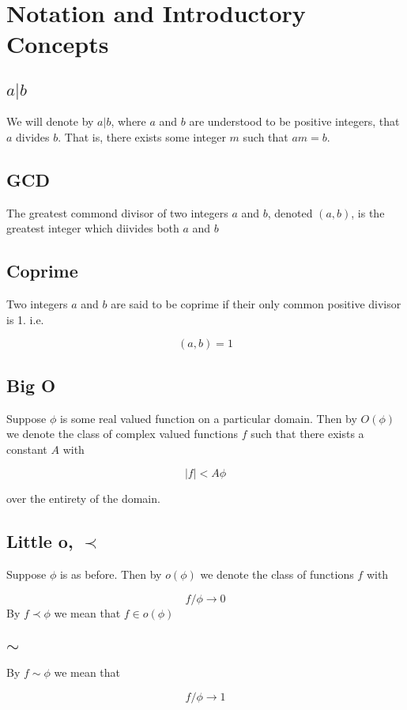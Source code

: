 \section{Notation and Introductory Concepts}

\subsection{$a|b$}

We will denote by $a|b$, where $a$ and $b$ are understood to be positive integers, that $a$ divides $b$. That is, 
there exists some integer $m$ such that $am = b$.

\subsection{GCD}
The greatest commond divisor of two integers $a$ and $b$, denoted $(a,b)$, is the greatest integer which diivides 
both $a$ and $b$

\subsection{Coprime}
Two integers $a$ and $b$ are said to be coprime if their only common positive divisor is 1. i.e.

\begin{equation*}
    (a, b) = 1
\end{equation*}

\subsection{Big O}

\noi
Suppose $\phi$ is some real valued function on a particular domain. Then by $O(\phi)$ we denote the class of complex valued 
functions $f$ such that there exists a constant $A$ with

\begin{equation*}
    |f| < A\phi
\end{equation*}

\noi
over the entirety of the domain.

\subsection{Little o, $\prec$}
Suppose $\phi$ is as before. Then by $o(\phi)$ we denote the class of functions $f$ with

\begin{equation*}
    f/\phi \to 0
\end{equation*}
\noi
By $f \prec \phi$ we mean that $f \in o(\phi)$

\subsection{$\sim$}
By $f \sim \phi$ we mean that

\begin{equation*}
    f/\phi \to 1
\end{equation*}

